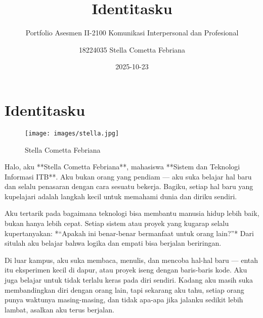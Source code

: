 
\title{Identitasku}
\subtitle{Portfolio Asesmen II-2100 Komunikasi Interpersonal dan Profesional}
\author{18224035 Stella Cometta Febriana}
\date{2025-10-23}


\maketitle

\renewcommand*\contentsname{Daftar Isi}
{
\hypersetup{linkcolor=}
\setcounter{tocdepth}{2}
\tableofcontents
}


\chapter*{Identitasku}\label{identitasku}


\begin{figure}[H]
{\centering \texttt{[image: images/stella.jpg]}}
\caption{Stella Cometta Febriana}
\end{figure}

Halo, aku **Stella Cometta Febriana**, mahasiswa **Sistem dan Teknologi Informasi ITB**.  
Aku bukan orang yang pendiam — aku suka belajar hal baru dan selalu penasaran dengan cara sesuatu bekerja.  
Bagiku, setiap hal baru yang kupelajari adalah langkah kecil untuk memahami dunia dan diriku sendiri.

Aku tertarik pada bagaimana teknologi bisa membantu manusia hidup lebih baik, bukan hanya lebih cepat.  
Setiap sistem atau proyek yang kugarap selalu kupertanyakan: *“Apakah ini benar-benar bermanfaat untuk orang lain?”*  
Dari situlah aku belajar bahwa logika dan empati bisa berjalan beriringan.

Di luar kampus, aku suka membaca, menulis, dan mencoba hal-hal baru — entah itu eksperimen kecil di dapur, atau proyek iseng dengan baris-baris kode.  
Aku juga belajar untuk tidak terlalu keras pada diri sendiri. Kadang aku masih suka membandingkan diri dengan orang lain,  
tapi sekarang aku tahu, setiap orang punya waktunya masing-masing, dan tidak apa-apa jika jalanku sedikit lebih lambat, asalkan aku terus berjalan.


